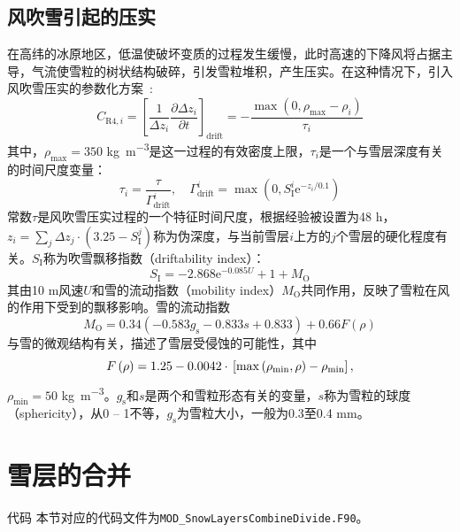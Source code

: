 \subsection{风吹雪引起的压实}
在高纬的冰原地区，低温使破坏变质的过程发生缓慢，此时高速的下降风将占据主导，气流使雪粒的树状结构破碎，引发雪粒堆积，产生压实。在这种情况下，引入风吹雪压实的参数化方案~\citep{Vionnet2012}:
\begin{equation}
  C_{\mathrm{R4},i}=\left[\frac{1}{\Delta z_i}\frac{\partial \Delta z_i}{\partial t}\right]_{\text{drift}}=-\frac{\max \left(0,\rho_{\text{max}}-\rho_i\right)}{\tau_i}
\end{equation}
其中，$\rho_{\text{max}}=350$ \unit{kg.m^{-3}}是这一过程的有效密度上限，$\tau_i$是一个与雪层深度有关的时间尺度变量：
\begin{equation}
  \tau_i=\frac{\tau}{\Gamma_{\text{drift}}^i}, \quad \Gamma_{\text{drift}}^i=\max \left(0,S_{\mathrm {I}} ^i {\mathrm e}^{-z_i/0.1}\right)
\end{equation}
常数$\tau$是风吹雪压实过程的一个特征时间尺度，根据经验被设置为48 \unit{h}，$z_{i} =\sum_j \Delta z_j \cdot \left(3.25-S_{\mathrm {I}} ^j\right)$称为伪深度，与当前雪层$i$上方的$j$个雪层的硬化程度有关。$S_{\mathrm {I}} $称为吹雪飘移指数（driftability index）：
\begin{equation}
  S_{\mathrm {I}} =-2.868 {\mathrm e}^{-0.085 U} + 1 + M_{\mathrm {O}}
\end{equation}
其由10 \unit{m}风速$U$和雪的流动指数（mobility index）$M_{\mathrm {O}}$共同作用，反映了雪粒在风的作用下受到的飘移影响。雪的流动指数
\begin{equation}
  M_{\mathrm {O}}=0.34\left(-0.583g_{\mathrm {s}} -0.833s+0.833\right)+0.66F\left(\rho\right)
\end{equation}
与雪的微观结构有关，描述了雪层受侵蚀的可能性，其中
$$F\left(\rho\right)=1.25-0.0042 \cdot \\\left[\max \left(\rho_{\mathrm{min}},\rho\right)-\rho_{\mathrm{min}}\right],$$$\rho_{\mathrm{min}}=50$ \unit{kg.m^{-3}}。$g_{\mathrm {s}} $和$s$是两个和雪粒形态有关的变量，$s$称为雪粒的球度（sphericity），从0 -- 1不等，$g_{\mathrm {s}} $为雪粒大小，一般为0.3至0.4 \unit{mm}。


\section{雪层的合并}\label{雪层的合并}
\begin{mymdframed}{代码}
  本节对应的代码文件为\texttt{MOD\_SnowLayersCombineDivide.F90}。
\end{mymdframed}

